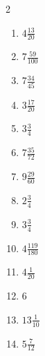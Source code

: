 \documentclass[12pt]{article}
\begin{document}
\begin{multicols}{2}
\begin{enumerate}
\item $ 4 \frac{13}{20} $
\item $ 7 \frac{59}{100} $
\item $ 7 \frac{34}{45} $
\item $ 3 \frac{17}{20} $
\item $ 3 \frac{3}{4} $
\item $ 7 \frac{35}{72} $
\item $ 9 \frac{29}{60} $
\item $ 2 \frac{3}{4} $
\item $ 3 \frac{3}{4} $
\item $ 4 \frac{119}{180} $
\item $ 4 \frac{1}{20} $
\item $ 6 $
\item $ 13 \frac{1}{10} $
\item $ 5 \frac{7}{12} $
\end{enumerate}\end{multicols}\newpage
\end{document}

